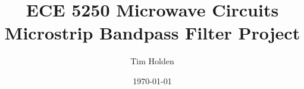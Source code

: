 \title{\textbf{ECE 5250 Microwave Circuits}\\ \textbf{Microstrip Bandpass Filter Project}}
\author{Tim Holden}
\date{\today}
